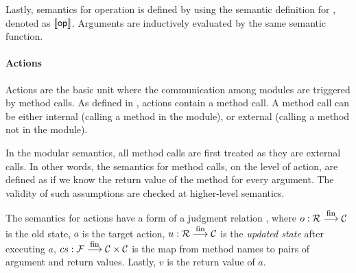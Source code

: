 Lastly, semantics for operation is defined by using the semantic
definition for \seop{}, denoted as $\llbracket \textsf{op}{} \rrbracket$. Arguments are
inductively evaluated by the same semantic function.

\paragraph{Actions}

Actions are the basic unit where the communication among modules are
triggered by method calls. As defined in , actions
contain a method call. A method call can be either internal (calling a
method in the module), or external (calling a method not in the
module).

In the modular semantics, all method calls are first treated as they
are external calls. In other words, the semantics for method calls, on
the level of action, are defined as if we know the return value of the
method for every argument. The validity of such assumptions are
checked at higher-level semantics.

The semantics for actions have a form of a judgment relation
, where $o : \mathcal{R} \stackrel{\textrm{\footnotesize{fin}}}{\longrightarrow} \mathcal{C}{}$ is the old state, $a$
is the target action, $u : \mathcal{R} \stackrel{\textrm{\footnotesize{fin}}}{\longrightarrow} \mathcal{C}{}$ is the \emph{updated state}
after executing $a$, $cs : \mathcal{F} \stackrel{\textrm{\footnotesize{fin}}}{\longrightarrow} \mathcal{C} \times \mathcal{C}{}$ is the map from method names to
pairs of argument and return values. Lastly, $v$ is the return value
of $a$.

